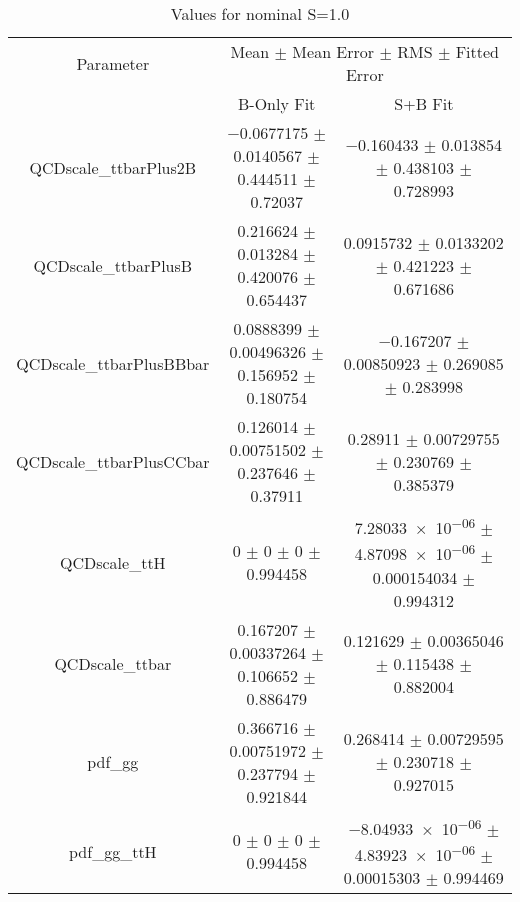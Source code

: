 \begin{table}
\centering
\caption{Values for nominal S=1.0}
\begin{tabular}{ccc}
\toprule
Parameter & \multicolumn{2}{c}{Mean $\pm$ Mean Error $\pm$ RMS $\pm$ Fitted Error}\\
 & B-Only Fit & S+B Fit\\
\midrule
QCDscale\_ttbarPlus2B & \num{-0.0677175} $\pm$ \num{0.0140567} $\pm$ \num{0.444511} $\pm$ \num{0.72037} & \num{-0.160433} $\pm$ \num{0.013854} $\pm$ \num{0.438103} $\pm$ \num{0.728993}\\
QCDscale\_ttbarPlusB & \num{0.216624} $\pm$ \num{0.013284} $\pm$ \num{0.420076} $\pm$ \num{0.654437} & \num{0.0915732} $\pm$ \num{0.0133202} $\pm$ \num{0.421223} $\pm$ \num{0.671686}\\
QCDscale\_ttbarPlusBBbar & \num{0.0888399} $\pm$ \num{0.00496326} $\pm$ \num{0.156952} $\pm$ \num{0.180754} & \num{-0.167207} $\pm$ \num{0.00850923} $\pm$ \num{0.269085} $\pm$ \num{0.283998}\\
QCDscale\_ttbarPlusCCbar & \num{0.126014} $\pm$ \num{0.00751502} $\pm$ \num{0.237646} $\pm$ \num{0.37911} & \num{0.28911} $\pm$ \num{0.00729755} $\pm$ \num{0.230769} $\pm$ \num{0.385379}\\
QCDscale\_ttH & \num{0} $\pm$ \num{0} $\pm$ \num{0} $\pm$ \num{0.994458} & \num{7.28033e-06} $\pm$ \num{4.87098e-06} $\pm$ \num{0.000154034} $\pm$ \num{0.994312}\\
QCDscale\_ttbar & \num{0.167207} $\pm$ \num{0.00337264} $\pm$ \num{0.106652} $\pm$ \num{0.886479} & \num{0.121629} $\pm$ \num{0.00365046} $\pm$ \num{0.115438} $\pm$ \num{0.882004}\\
pdf\_gg & \num{0.366716} $\pm$ \num{0.00751972} $\pm$ \num{0.237794} $\pm$ \num{0.921844} & \num{0.268414} $\pm$ \num{0.00729595} $\pm$ \num{0.230718} $\pm$ \num{0.927015}\\
pdf\_gg\_ttH & \num{0} $\pm$ \num{0} $\pm$ \num{0} $\pm$ \num{0.994458} & \num{-8.04933e-06} $\pm$ \num{4.83923e-06} $\pm$ \num{0.00015303} $\pm$ \num{0.994469}\\
\bottomrule
\end{tabular}
\end{table}